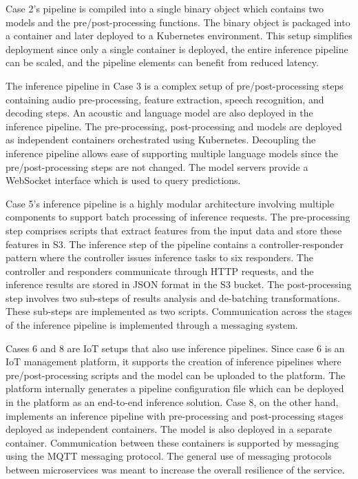 Case 2's pipeline is compiled into a single binary object which contains two models and the pre/post-processing functions. The binary object is packaged into a container and later deployed to a Kubernetes environment. This setup simplifies deployment since only a single container is deployed, the entire inference pipeline can be scaled, and the pipeline elements can benefit from reduced latency.

The inference pipeline in Case 3 is a complex setup of pre/post-processing steps containing audio pre-processing, feature extraction, speech recognition, and decoding steps. An acoustic and language model are also deployed in the inference pipeline. The pre-processing, post-processing and models are deployed as independent containers orchestrated using Kubernetes. Decoupling the inference pipeline allows ease of supporting multiple language models since the pre/post-processing steps are not changed. The model servers provide a WebSocket interface which is used to query predictions. %

Case 5's inference pipeline is a highly modular architecture involving multiple components to support batch processing of inference requests. The pre-processing step comprises \DIFdelbegin {}\DIFdelend \DIFaddbegin {}\DIFaddend scripts that extract features from the input data and store these features in S3. The inference step of the pipeline contains a controller-responder pattern where the controller issues inference tasks to six responders. The controller and responders communicate through HTTP requests, and the inference results are stored in JSON format in the S3 bucket. The post-processing step involves two sub-steps of results analysis and de-batching transformations. These sub-steps are implemented as two \DIFdelbegin {}\DIFdelend \DIFaddbegin {}\DIFaddend scripts. Communication across the stages of the inference pipeline is implemented through a messaging system.

Cases 6 and 8 are IoT setups that also use inference pipelines. Since case 6 is an IoT management platform, it supports the creation of inference pipelines where pre/post-processing scripts and the model can be uploaded to the platform. The platform internally generates a pipeline configuration file which can be deployed in the platform as an end-to-end inference solution. Case 8, on the other hand, implements an inference pipeline with pre-processing and post-processing stages deployed as independent containers. The model is also deployed in a separate container. Communication between these containers is supported by messaging using the MQTT messaging protocol. The general use of messaging protocols between microservices was meant to increase the overall resilience of the service.

